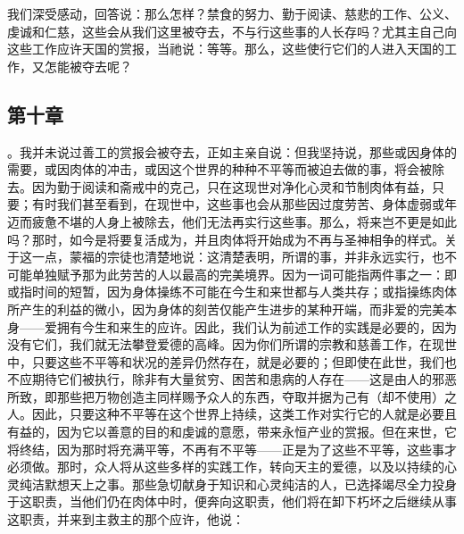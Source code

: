 \par

我们深受感动，回答说：那么怎样？禁食的努力、勤于阅读、慈悲的工作、公义、虔诚和仁慈，这些会从我们这里被夺去，不与行这些事的人长存吗？尤其主自己向这些工作应许天国的赏报，当祂说：等等。那么，这些使行它们的人进入天国的工作，又怎能被夺去呢？\par


\subsection{第十章}

\par

。我并未说过善工的赏报会被夺去，正如主亲自说：但我坚持说，那些或因身体的需要，或因肉体的冲击，或因这个世界的种种不平等而被迫去做的事，将会被除去。因为勤于阅读和斋戒中的克己，只在这现世对净化心灵和节制肉体有益，只要；有时我们甚至看到，在现世中，这些事也会从那些因过度劳苦、身体虚弱或年迈而疲惫不堪的人身上被除去，他们无法再实行这些事。那么，将来岂不更是如此吗？那时，如今是将要复活成为，并且肉体将开始成为不再与圣神相争的样式。关于这一点，蒙福的宗徒也清楚地说：这清楚表明，所谓的事，并非永远实行，也不可能单独赋予那为此劳苦的人以最高的完美境界。因为一词可能指两件事之一：即或指时间的短暂，因为身体操练不可能在今生和来世都与人类共存；或指操练肉体所产生的利益的微小，因为身体的刻苦仅能产生进步的某种开端，而非爱的完美本身——爱拥有今生和来生的应许。因此，我们认为前述工作的实践是必要的，因为没有它们，我们就无法攀登爱德的高峰。因为你们所谓的宗教和慈善工作，在现世中，只要这些不平等和状况的差异仍然存在，就是必要的；但即使在此世，我们也不应期待它们被执行，除非有大量贫穷、困苦和患病的人存在——这是由人的邪恶所致，即那些把万物创造主同样赐予众人的东西，夺取并据为己有（却不使用）之人。因此，只要这种不平等在这个世界上持续，这类工作对实行它的人就是必要且有益的，因为它以善意的目的和虔诚的意愿，带来永恒产业的赏报。但在来世，它将终结，因为那时将充满平等，不再有不平等——正是为了这些不平等，这些事才必须做。那时，众人将从这些多样的实践工作，转向天主的爱德，以及以持续的心灵纯洁默想天上之事。那些急切献身于知识和心灵纯洁的人，已选择竭尽全力投身于这职责，当他们仍在肉体中时，便奔向这职责，他们将在卸下朽坏之后继续从事这职责，并来到主救主的那个应许，他说：\par

